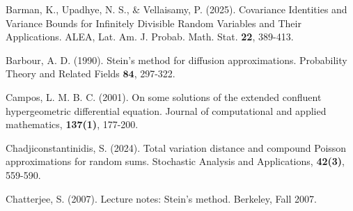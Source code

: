 \documentclass[12pt, a4paper,reqno]{amsart}
\theoremstyle{definition}
\theoremstyle{myremark}
\numberwithin{equation}{section}
\begin{document}
\begin{thebibliography}{}
	
	
	
	
	 Barman, K., Upadhye, N. S., \& Vellaisamy, P. (2025). Covariance Identities and Variance Bounds for Infinitely Divisible Random Variables and Their Applications. ALEA, Lat. Am. J. Probab. Math. Stat. \textbf{22}, 389-413.
	
	 Barbour, A. D. (1990). Stein's method for diffusion approximations. Probability Theory and Related Fields $\mathbf{84}$, 297-322.
	
	
	Campos, L. M. B. C. (2001). On some solutions of the extended confluent hypergeometric differential equation. Journal of computational and applied mathematics, \textbf{137(1)}, 177-200.
	
	Chadjiconstantinidis, S. (2024). Total variation distance and compound Poisson approximations for random sums. Stochastic Analysis and Applications, \textbf{42(3)}, 559-590.
	
	 Chatterjee, S. (2007). Lecture notes: Stein's method. Berkeley, Fall 2007.
	
	
	

\end{thebibliography}
\end{document}
